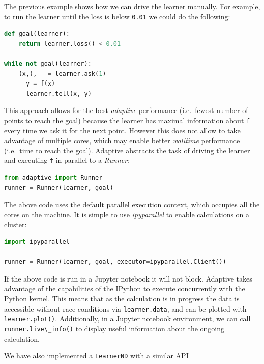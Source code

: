 
The previous example shows how we can drive the learner manually.
For example, to run the learner until the loss is below \passthrough{\lstinline!0.01!} we could do the following:

\begin{lstlisting}[language=Python]
def goal(learner):
    return learner.loss() < 0.01

while not goal(learner):
    (x,), _ = learner.ask(1)
      y = f(x)
      learner.tell(x, y)
\end{lstlisting}

This approach allows for the best \emph{adaptive} performance (i.e.~fewest number of points to reach the goal) because the learner has maximal information about \passthrough{\lstinline!f!} every time we ask it for the next point.
However this does not allow to take advantage of multiple cores, which may enable better \emph{walltime} performance (i.e.~time to reach the goal).
Adaptive abstracts the task of driving the learner and executing \passthrough{\lstinline!f!} in parallel to a \emph{Runner}:

\begin{lstlisting}[language=Python]
from adaptive import Runner
runner = Runner(learner, goal)
\end{lstlisting}

The above code uses the default parallel execution context, which occupies all the cores on the machine.
It is simple to use \emph{ipyparallel} to enable calculations on a cluster:

\begin{lstlisting}[language=Python]
import ipyparallel

runner = Runner(learner, goal, executor=ipyparallel.Client())
\end{lstlisting}

If the above code is run in a Jupyter notebook it will not block.
Adaptive takes advantage of the capabilities of the IPython to execute concurrently with the Python kernel.
This means that as the calculation is in progress the data is accessible without race conditions via \passthrough{\lstinline!learner.data!}, and can be plotted with \passthrough{\lstinline!learner.plot()!}.
Additionally, in a Jupyter notebook environment, we can call \passthrough{\lstinline!runner.live\_info()!} to display useful information about the ongoing calculation.

We have also implemented a \passthrough{\lstinline!LearnerND!} with a similar API

